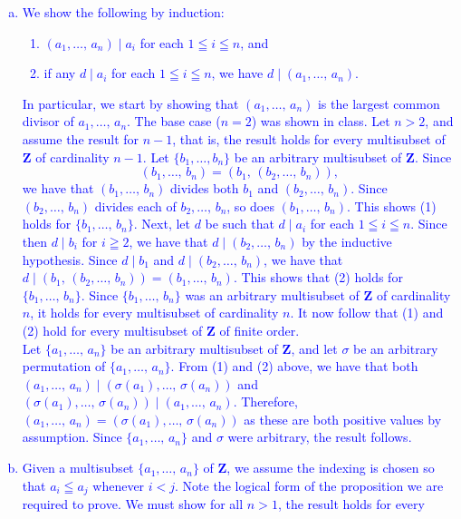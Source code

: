 \documentclass[a4paper,11pt]{article}
\theoremstyle{mythm}
\theoremstyle{mydef}
\newcommand{\blue}[1]{\textcolor{blue}{#1}}
\newcommand{\Z}{\mathbf{Z}}
\begin{document}
\blue{
  \begin{enumerate}[(a)]
  \item We show the following by induction:
    \begin{enumerate}[(1)]
    \item $(a_1,\dots,\,a_n) \mid a_i$ for each $1 \leqq i \leqq n$, and
    \item if any $d \mid a_i$ for each $1 \leqq i \leqq n$, we have $d \mid
      (a_1,\dots,\,a_n)$.
    \end{enumerate}
    In particular, we start by showing that $(a_1,\dots,\,a_n)$ is the largest
    common divisor of $a_1,\dots,\,a_n$.
    The base case ($n=2$) was shown in class. Let $n > 2$, and assume the result
    for $n-1$, that is, the result holds for every multisubset of $\Z$ of
    cardinality $n-1$. Let $\{b_1,\dots,b_n\}$ be an arbitrary multisubset of
    $\Z$. Since
    \[
      (b_1,\dots,\,b_n) = (b_1,\,(b_2,\dots,\,b_n)),
    \]
    we have that $(b_1,\dots,\,b_n)$ divides both $b_1$ and $(b_2,\dots,\,b_n)$.
    Since $(b_2,\dots,\,b_n)$ divides each of $b_2,\dots,\,b_n$, so does
    $(b_1,\dots,\,b_n)$. This shows (1) holds for $\{b_1,\dots,\,b_n\}$. Next,
    let $d$ be such that $d \mid a_i$ for each $1 \leqq i \leqq n$. Since then
    $d \mid b_i$ for $i \geqq 2$, we have that $d \mid (b_2,\dots,\,b_n)$ by the
    inductive hypothesis. Since $d \mid b_1$ and $d \mid (b_2,\dots,\,b_n)$, we
    have that $d \mid (b_1,\,(b_2,\dots,\,b_n))=(b_1,\dots,\,b_n)$. This shows
    that (2) holds for $\{b_1,\dots,\,b_n\}$. Since $\{b_1,\dots,\,b_n\}$ was an
    arbitrary multisubset of $\Z$ of cardinality $n$, it holds for every
    multisubset of cardinality $n$. It now follow that (1) and (2) hold for
    every multisubset of $\Z$ of finite order. \\
    Let $\{a_1,\dots,\,a_n\}$ be an arbitrary multisubset of $\Z$, and let
    $\sigma$ be an arbitrary permutation of $\{a_1,\dots,\,a_n\}$. From (1) and
    (2) above, we have that both $(a_1,\dots,\,a_n) \mid
    (\sigma(a_1),\dots,\,\sigma(a_n))$ and $(\sigma(a_1),\dots,\,\sigma(a_n))
    \mid (a_1,\dots,\,a_n)$. Therefore,
    $(a_1,\dots,\,a_n)=(\sigma(a_1),\dots,\,\sigma(a_n))$ as these are both
    positive values by assumption. Since $\{a_1,\dots,\,a_n\}$ and $\sigma$ were
    arbitrary, the result follows.
  \item Given a multisubset
$\{a_1,\dots,\,a_n\}$ of $\Z$, we assume the indexing is chosen so that $a_i
\leqq a_j$ whenever $i < j$. Note the logical form of the proposition we are
required to prove. We must show for all $n>1$, the result holds for every

\end{enumerate}}
\end{document}
